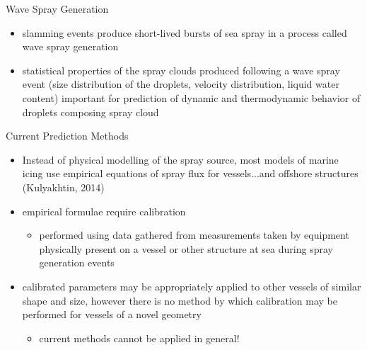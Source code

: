 \begin{frame}{\thesec}{\thesubsec}
  \vspace*{-\baselineskip}
  \begin{block}{Wave Spray Generation}
    \vspace*{0.5em}
    \begin{itemize}
      \item{
        slamming events produce short-lived bursts of sea spray in a process called \alert{wave spray generation}
      }
      \vspace*{0.5em}
      \item{
        statistical properties of the spray clouds produced following a wave spray event (size distribution of the droplets, velocity distribution, liquid water content) important for prediction of dynamic and thermodynamic behavior of droplets composing spray cloud
      }
    \end{itemize}
  \end{block}
\end{frame}

\begin{frame}{\thesec}{\thesubsec}
  \vspace*{-2\baselineskip}
  \begin{block}{Current Prediction Methods}
    \begin{itemize}
      \item{
        Instead of physical modelling of the spray source, most models of marine icing use empirical equations of spray flux for vessels...and offshore structures (Kulyakhtin, 2014) {\color{white}\cite{Kulyakhtin14}}
      }
      \item{
        empirical formulae require calibration
        \begin{itemize}
          \item{
            performed using data gathered from measurements taken by equipment physically present on a vessel or other structure at sea during spray generation events
          }
        \end{itemize}
      }
      \item{
        calibrated parameters may be appropriately applied to other vessels of similar shape and size, however there is no method by which calibration may be performed for vessels of a novel geometry
        \begin{itemize}
          \item{
            current methods cannot be applied in general!
          }
        \end{itemize}
      }
    \end{itemize}
  \end{block}
\end{frame}
